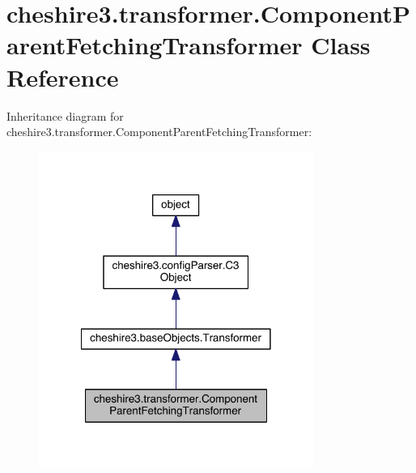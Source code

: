 \hypertarget{classcheshire3_1_1transformer_1_1_component_parent_fetching_transformer}{\section{cheshire3.\-transformer.\-Component\-Parent\-Fetching\-Transformer Class Reference}
\label{classcheshire3_1_1transformer_1_1_component_parent_fetching_transformer}
}


Inheritance diagram for cheshire3.\-transformer.\-Component\-Parent\-Fetching\-Transformer\-:
\nopagebreak
\begin{figure}[H]
\begin{center}
\leavevmode
\includegraphics[width=254pt]{classcheshire3_1_1transformer_1_1_component_parent_fetching_transformer__inherit__graph}
\end{center}
\end{figure}


